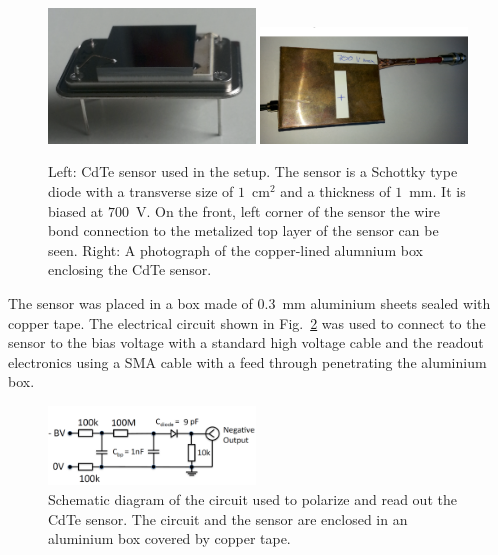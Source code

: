 \begin{figure}[htbp] 
\centering
\includegraphics[width=0.49\textwidth]{figures/CdTeSensor.png} 
\includegraphics[width=0.49\textwidth]{figures/CdTeSensorBox.png} 
\caption{Left: CdTe sensor used in the setup. The sensor is a Schottky type diode with a transverse size 
of $1$~$\mathrm{cm}^{2}$ and a thickness of $1$~mm. It is biased at $700$~V. 
On the front, left corner of the sensor the wire bond connection 
to the metalized top layer of the sensor can be seen. Right: A photograph of the copper-lined alumnium box
enclosing the CdTe sensor. } 
\label{fig:CdTeSensor} 
\end{figure} 
%
The sensor was placed in a box made of $0.3$~mm aluminium sheets sealed with copper tape. 
The electrical circuit shown in Fig.~\ref{fig:cdtecircuit} was used to connect to the sensor to the bias 
voltage with a standard high voltage cable and the readout electronics using a SMA cable with a feed 
through penetrating the aluminium box.

%
\begin{figure}[htbp] 
\centering
\includegraphics[width=0.49\textwidth]{figures/circuit_CdTe.png} 
\caption{Schematic diagram of the circuit used to polarize and read out the 
CdTe sensor. The circuit and the sensor are enclosed in an aluminium box covered by
copper tape.} 
\label{fig:cdtecircuit} 
\end{figure} 
%
